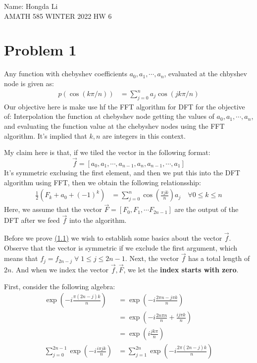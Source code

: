 \documentclass[]{article}
\begin{document}
\begin{center}
    Name: Hongda Li
    \\
    AMATH 585 WINTER 2022 HW 6
\end{center}
\section*{Problem 1}
    Any function with chebyshev coefficients $a_0, a_1, \cdots, a_n$, evaluated at the chbyshev node is given as: 
    \begin{align*}\tag{1}\label{eqn:1}
        p(\cos(k\pi/n)) &= 
        \sum_{j = 0}^{n}a_j\cos(jk\pi/n)
    \end{align*}
    Our objective here is make use hf the FFT algorithm for DFT for the objective of: Interpolation the function at chebyshev node getting the values of $a_0, a_1, \cdots, a_n$, and evaluating the function value at the chebyshev nodes using the FFT algorithm. It's implied that $k, n$ are integers in this context. 
    \par
    My claim here is that, if we tiled the vector in the following format:
    $$\vec{f} = [a_0, a_1, \cdots, a_{n - 1}, a_n, a_{n - 1}, \cdots, a_1]$$
    It's symmetric exclusing the first element, and then we put this into the DFT algorithm using FFT, then we obtain the following relationsship: 
    \begin{align*}\tag{1.1}\label{eqn:1.1}
        \frac{1}{2}(F_k + a_0 + (-1)^k)
        &= 
        \sum_{j = 0}^{n}\cos\left(
            \frac{\pi j k}{n}
        \right)a_j \quad \forall 0 \le k \le n
    \end{align*}
    Here, we assume that the vector $\vec{F} = [F_0, F_1, \cdots F_{2n - 1}]$ are the output of the DFT after we feed $\vec{f}$ into the algorithm. 
    \par
    Before we prove \hyperref[eqn:1.1]{(1.1)} we wish to establish some basics about the vector $\vec{f}$. Observe that the vector is symmetric if we exclude the first argument, which means that $f_j = f_{2n - j}\; \forall\; 1 \le j \le 2n - 1$. Next, the vector $\vec{f}$ has a total length of $2n$. And when we index the vector $\vec{f}, \vec{F}$, we let the \textbf{index starts with zero}. 
    \par
    First, consider the following algebra: 
    \begin{align*}\tag{1.2}\label{eqn:1.2}
        \exp\left(
            -i\frac{\pi(2n - j)k}{n}
        \right) &= 
        \exp\left(
            -i \frac{2\pi n - j\pi k}{n}
        \right)
        \\
        &= \exp
        \left(
            -i\frac{2n\pi n}{n} + \frac{ij\pi k}{n}
        \right)
        \\
        &= \exp\left(
            i\frac{jk\pi}{n}
        \right)
        \\
        \sum_{j = 0}^{2n - 1}
        \exp\left(
            -i \frac{i\pi j k}{n}
        \right) &= 
        \sum_{j = 1}^{2n}
        \exp\left(
            -i \frac{2\pi(2n - j)k}{n}
        \right)
    \end{align*}
\end{document}
